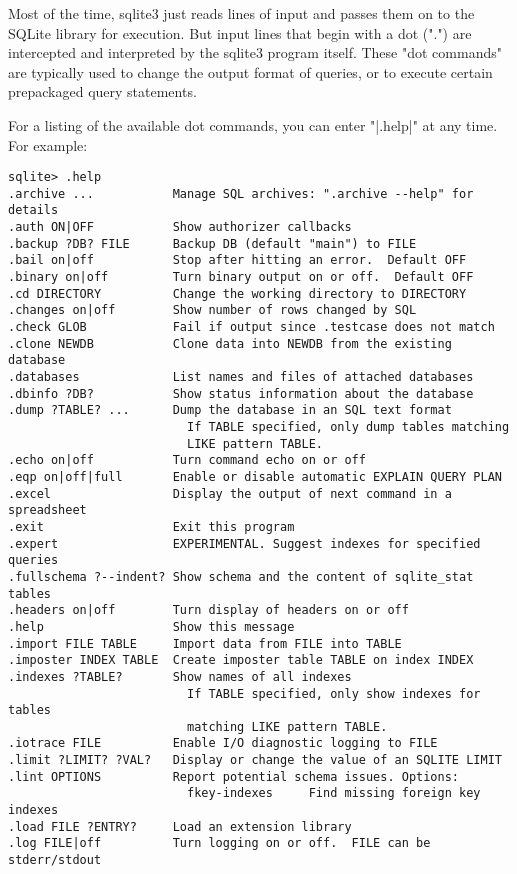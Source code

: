 Most of the time, sqlite3 just reads lines of input and passes them on to the SQLite library for execution. But input lines that begin with a dot (".") are intercepted and interpreted by the sqlite3 program itself. These "dot commands" are typically used to change the output format of queries, or to execute certain prepackaged query statements.

For a listing of the available dot commands, you can enter "|.help|" at any time. For example:

\begin{verbatim}
sqlite> .help
.archive ...           Manage SQL archives: ".archive --help" for details
.auth ON|OFF           Show authorizer callbacks
.backup ?DB? FILE      Backup DB (default "main") to FILE
.bail on|off           Stop after hitting an error.  Default OFF
.binary on|off         Turn binary output on or off.  Default OFF
.cd DIRECTORY          Change the working directory to DIRECTORY
.changes on|off        Show number of rows changed by SQL
.check GLOB            Fail if output since .testcase does not match
.clone NEWDB           Clone data into NEWDB from the existing database
.databases             List names and files of attached databases
.dbinfo ?DB?           Show status information about the database
.dump ?TABLE? ...      Dump the database in an SQL text format
                         If TABLE specified, only dump tables matching
                         LIKE pattern TABLE.
.echo on|off           Turn command echo on or off
.eqp on|off|full       Enable or disable automatic EXPLAIN QUERY PLAN
.excel                 Display the output of next command in a spreadsheet
.exit                  Exit this program
.expert                EXPERIMENTAL. Suggest indexes for specified queries
.fullschema ?--indent? Show schema and the content of sqlite_stat tables
.headers on|off        Turn display of headers on or off
.help                  Show this message
.import FILE TABLE     Import data from FILE into TABLE
.imposter INDEX TABLE  Create imposter table TABLE on index INDEX
.indexes ?TABLE?       Show names of all indexes
                         If TABLE specified, only show indexes for tables
                         matching LIKE pattern TABLE.
.iotrace FILE          Enable I/O diagnostic logging to FILE
.limit ?LIMIT? ?VAL?   Display or change the value of an SQLITE LIMIT
.lint OPTIONS          Report potential schema issues. Options:
                         fkey-indexes     Find missing foreign key indexes
.load FILE ?ENTRY?     Load an extension library
.log FILE|off          Turn logging on or off.  FILE can be stderr/stdout

\end{verbatim}
